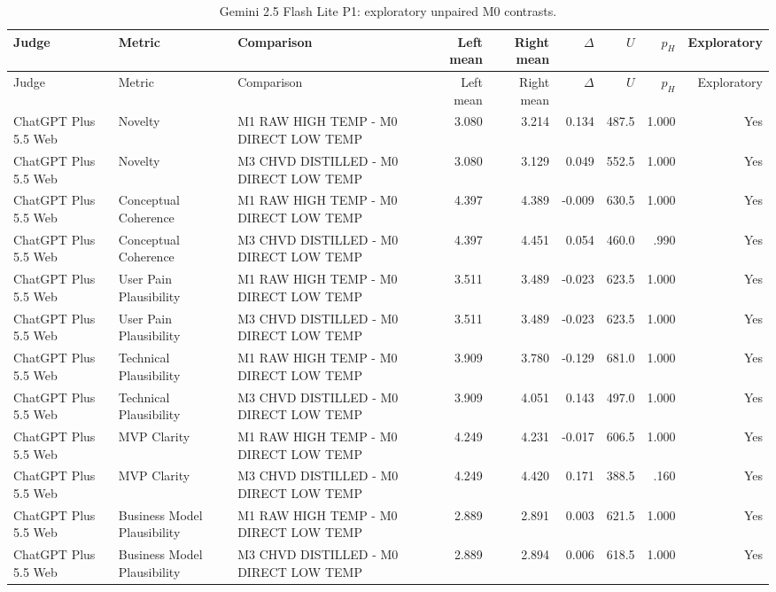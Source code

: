 \documentclass[10pt]{article}
\begin{document}
\begin{landscape}
\small
\begin{longtable}{lllrrrrrr}
\caption{Gemini 2.5 Flash Lite P1: exploratory unpaired M0 contrasts.}\label{tab:s19-m025p1}\\
\toprule Judge & Metric & Comparison & Left mean & Right mean & $\Delta$ & $U$ & $p_H$ & Exploratory \\ \midrule\endfirsthead
\toprule Judge & Metric & Comparison & Left mean & Right mean & $\Delta$ & $U$ & $p_H$ & Exploratory \\ \midrule\endhead
\bottomrule\endfoot
ChatGPT Plus 5.5 Web & Novelty & M1 RAW HIGH TEMP - M0 DIRECT LOW TEMP & 3.080 & 3.214 & 0.134 & 487.5 & 1.000 & Yes \\
ChatGPT Plus 5.5 Web & Novelty & M3 CHVD DISTILLED - M0 DIRECT LOW TEMP & 3.080 & 3.129 & 0.049 & 552.5 & 1.000 & Yes \\
ChatGPT Plus 5.5 Web & Conceptual Coherence & M1 RAW HIGH TEMP - M0 DIRECT LOW TEMP & 4.397 & 4.389 & -0.009 & 630.5 & 1.000 & Yes \\
ChatGPT Plus 5.5 Web & Conceptual Coherence & M3 CHVD DISTILLED - M0 DIRECT LOW TEMP & 4.397 & 4.451 & 0.054 & 460.0 & .990 & Yes \\
ChatGPT Plus 5.5 Web & User Pain Plausibility & M1 RAW HIGH TEMP - M0 DIRECT LOW TEMP & 3.511 & 3.489 & -0.023 & 623.5 & 1.000 & Yes \\
ChatGPT Plus 5.5 Web & User Pain Plausibility & M3 CHVD DISTILLED - M0 DIRECT LOW TEMP & 3.511 & 3.489 & -0.023 & 623.5 & 1.000 & Yes \\
ChatGPT Plus 5.5 Web & Technical Plausibility & M1 RAW HIGH TEMP - M0 DIRECT LOW TEMP & 3.909 & 3.780 & -0.129 & 681.0 & 1.000 & Yes \\
ChatGPT Plus 5.5 Web & Technical Plausibility & M3 CHVD DISTILLED - M0 DIRECT LOW TEMP & 3.909 & 4.051 & 0.143 & 497.0 & 1.000 & Yes \\
ChatGPT Plus 5.5 Web & MVP Clarity & M1 RAW HIGH TEMP - M0 DIRECT LOW TEMP & 4.249 & 4.231 & -0.017 & 606.5 & 1.000 & Yes \\
ChatGPT Plus 5.5 Web & MVP Clarity & M3 CHVD DISTILLED - M0 DIRECT LOW TEMP & 4.249 & 4.420 & 0.171 & 388.5 & .160 & Yes \\
ChatGPT Plus 5.5 Web & Business Model Plausibility & M1 RAW HIGH TEMP - M0 DIRECT LOW TEMP & 2.889 & 2.891 & 0.003 & 621.5 & 1.000 & Yes \\
ChatGPT Plus 5.5 Web & Business Model Plausibility & M3 CHVD DISTILLED - M0 DIRECT LOW TEMP & 2.889 & 2.894 & 0.006 & 618.5 & 1.000 & Yes \\

\end{longtable}
\end{landscape}
\end{document}
